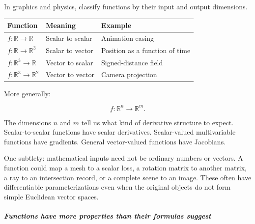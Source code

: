In graphics and physics, classify functions by their input and output dimensions.

{\def\LTcaptype{none} %
\begin{longtable}[]{@{}
  >{\raggedright\arraybackslash}p{}
  >{\raggedright\arraybackslash}p{}
  >{\raggedright\arraybackslash}p{}@{}}
\toprule\noalign{}
\begin{minipage}[b]{\linewidth}\raggedright
Function
\end{minipage} & \begin{minipage}[b]{\linewidth}\raggedright
Meaning
\end{minipage} & \begin{minipage}[b]{\linewidth}\raggedright
Example
\end{minipage} \\
\midrule\noalign{}
\endhead
\bottomrule\noalign{}
\endlastfoot
\(f:\mathbb R\to\mathbb R\) & Scalar to scalar & Animation easing \\
\(f:\mathbb R\to\mathbb R^3\) & Scalar to vector & Position as a function of time \\
\(f:\mathbb R^3\to\mathbb R\) & Vector to scalar & Signed-distance field \\
\(f:\mathbb R^3\to\mathbb R^2\) & Vector to vector & Camera projection \\
\end{longtable}
}

More generally:

\[
f:\mathbb R^n\rightarrow\mathbb R^m.
\]

The dimensions \(n\) and \(m\) tell us what kind of derivative structure to expect. Scalar-to-scalar functions have scalar derivatives. Scalar-valued multivariable functions have gradients. General vector-valued functions have Jacobians.

One subtlety: mathematical inputs need not be ordinary numbers or vectors. A function could map a mesh to a scalar loss, a rotation matrix to another matrix, a ray to an intersection record, or a complete scene to an image. These often have differentiable parameterizations even when the original objects do not form simple Euclidean vector spaces.

\subparagraph{Functions have more properties than their formulas suggest}\label{01-foundations-i-ch020-functions-have-more-properties-than-their-formulas-suggest}

